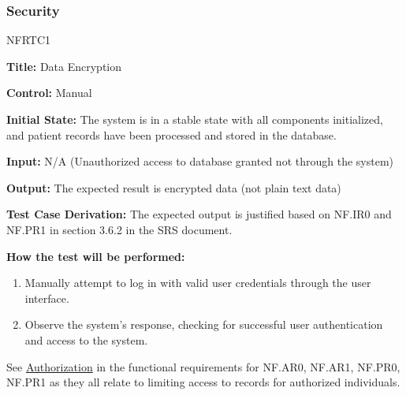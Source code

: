 \documentclass[12pt, titlepage]{article}
\begin{document}
\subsubsection{Security}
\begin{itemize}
    \begin{item}
        NFRTC1
        \begin{mdframed}[linewidth=0.5mm]
            \textbf{Title:} Data Encryption \par
            \textbf{Control:} Manual \par
            \textbf{Initial State:} The system is in a stable state with all components initialized, and patient records have been processed and stored in the database. \par
            \textbf{Input:} N/A (Unauthorized access to database granted not through the system) \par
            \textbf{Output:} The expected result is encrypted data (not plain text data) \par
            \textbf{Test Case Derivation:} The expected output is justified based on NF.IR0 and NF.PR1 in section 3.6.2 in the SRS document. \par
            \textbf{How the test will be performed:}
            \begin{enumerate} [noitemsep]
                \item Manually attempt to log in with valid user credentials through the user interface.
                \item Observe the system's response, checking for successful user authentication and access to the system.
            \end{enumerate}
        \end{mdframed}
    \end{item}
\end{itemize}
See \hyperlink{Auth}{Authorization} in the functional requirements for NF.AR0, NF.AR1, NF.PR0, NF.PR1 as they all relate to limiting access to records for authorized individuals.
\end{document}

